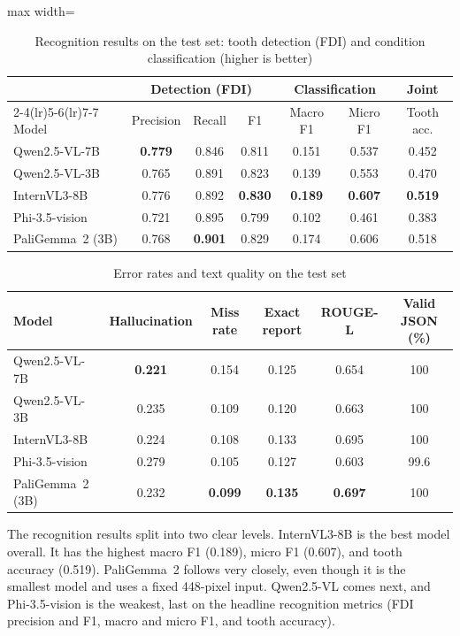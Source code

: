 \documentclass[a4paper,12pt]{report}
\begin{document}
\begin{table}[H]
\centering
\caption{Recognition results on the test set: tooth detection (FDI) and condition classification (higher is better)}
\label{tab:results-recognition}
\small
\begin{adjustbox}{max width=\textwidth}
\begin{tabular}{lcccccc}
\toprule
& \multicolumn{3}{c}{Detection (FDI)} & \multicolumn{2}{c}{Classification} & Joint \\
\cmidrule(lr){2-4}\cmidrule(lr){5-6}\cmidrule(lr){7-7}
Model & Precision & Recall & F1 & Macro F1 & Micro F1 & Tooth acc. \\
\midrule
Qwen2.5-VL-7B      & \textbf{0.779} & 0.846 & 0.811 & 0.151 & 0.537 & 0.452 \\
Qwen2.5-VL-3B      & 0.765 & 0.891 & 0.823 & 0.139 & 0.553 & 0.470 \\
InternVL3-8B       & 0.776 & 0.892 & \textbf{0.830} & \textbf{0.189} & \textbf{0.607} & \textbf{0.519} \\
Phi-3.5-vision     & 0.721 & 0.895 & 0.799 & 0.102 & 0.461 & 0.383 \\
PaliGemma~2 (3B)   & 0.768 & \textbf{0.901} & 0.829 & 0.174 & 0.606 & 0.518 \\
\bottomrule
\end{tabular}
\end{adjustbox}
\end{table}

\begin{table}[H]
\centering
\caption{Error rates and text quality on the test set}
\label{tab:results-text}
\small
\begin{tabular}{lccccc}
\toprule
Model & Hallucination & Miss rate & Exact report & ROUGE-L & Valid JSON (\%) \\
\midrule
Qwen2.5-VL-7B      & \textbf{0.221} & 0.154 & 0.125 & 0.654 & 100 \\
Qwen2.5-VL-3B      & 0.235 & 0.109 & 0.120 & 0.663 & 100 \\
InternVL3-8B       & 0.224 & 0.108 & 0.133 & 0.695 & 100 \\
Phi-3.5-vision     & 0.279 & 0.105 & 0.127 & 0.603 & 99.6 \\
PaliGemma~2 (3B)   & 0.232 & \textbf{0.099} & \textbf{0.135} & \textbf{0.697} & 100 \\
\bottomrule
\end{tabular}
\end{table}

The recognition results split into two clear levels. InternVL3-8B is the best model overall. It has the highest macro F1 (0.189), micro F1 (0.607), and tooth accuracy (0.519). PaliGemma~2 follows very closely, even though it is the smallest model and uses a fixed 448-pixel input. Qwen2.5-VL comes next, and Phi-3.5-vision is the weakest, last on the headline recognition metrics (FDI precision and F1, macro and micro F1, and tooth accuracy).
\end{document}
